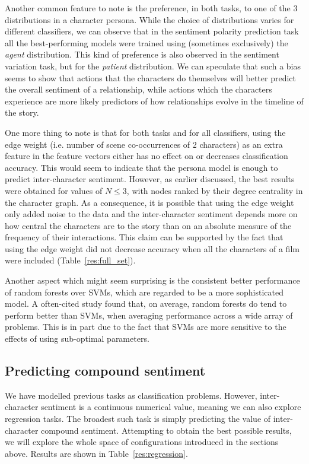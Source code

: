\documentclass[bsc,frontabs,deptreport,singlespacing,parskip, twoside]{infthesis}
\begin{document}
Another common feature to note is the preference, in both tasks, to one of the 3 distributions in a character persona. While the choice of distributions varies for different classifiers, we can observe that in the sentiment polarity prediction task all the best-performing models were trained using (sometimes exclusively) the \textit{agent} distribution. This kind of preference is also observed in the sentiment variation task, but for the \textit{patient} distribution. We can speculate that such a bias seems to show that actions that the characters do themselves will better predict the overall sentiment of a relationship, while actions which the characters experience are more likely predictors of how relationships evolve in the timeline of the story.

One more thing to note is that for both tasks and for all classifiers, using the edge weight (i.e. number of scene co-occurrences of 2 characters) as an extra feature in the feature vectors either has no effect on or decreases classification accuracy. This would seem to indicate that the persona model is enough to predict inter-character sentiment. However, as earlier discussed, the best results were obtained for values of $N \le 3$, with nodes ranked by their degree centrality in the character graph. As a consequence, it is possible that using the edge weight only added noise to the data and the inter-character sentiment depends more on how central the characters are to the story than on an absolute measure of the frequency of their interactions. This claim can be supported by the fact that using the edge weight did not decrease accuracy when all the characters of a film were included (Table~\ref{res:full_set}).

Another aspect which might seem surprising is the consistent better performance of random forests over SVMs, which are regarded to be a more sophisticated model. A often-cited study \cite{caruana2006} found that, on average, random forests do tend to perform better than SVMs, when averaging performance across a wide array of problems. This is in part due to the fact that SVMs are more sensitive to the effects of using sub-optimal parameters.

\subsection{Predicting compound sentiment}
We have modelled previous tasks as classification problems. However, inter-character sentiment is a continuous numerical value, meaning we can also explore regression tasks. The broadest such task is simply predicting the value of inter-character compound sentiment. Attempting to obtain the best possible results, we will explore the whole space of configurations introduced in the sections above. Results are shown in Table~\ref{res:regression}. 
\end{document}
